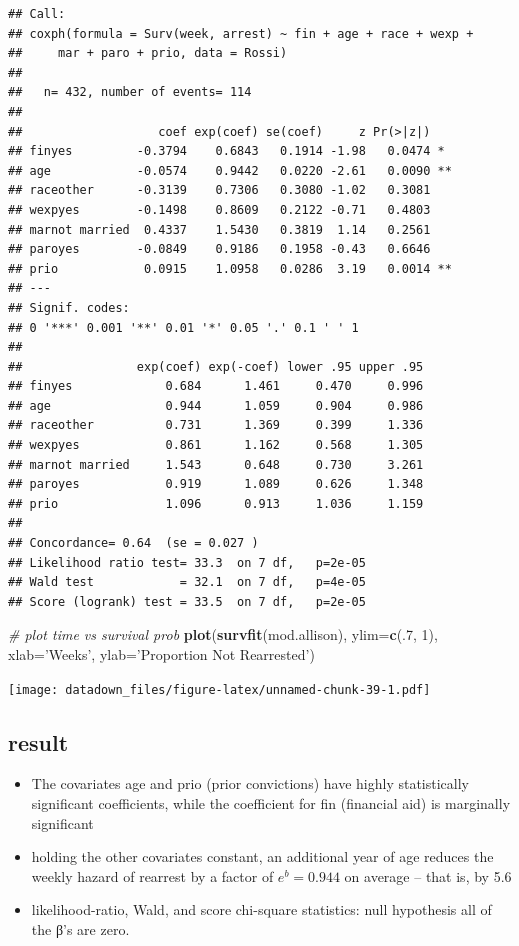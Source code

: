 \documentclass[
]{book}
\newenvironment{Shaded}{\begin{snugshade}}{\end{snugshade}}
\newcommand{\CommentTok}[1]{\textcolor[rgb]{0.56,0.35,0.01}{\textit{#1}}}
\newcommand{\DataTypeTok}[1]{\textcolor[rgb]{0.13,0.29,0.53}{#1}}
\newcommand{\DecValTok}[1]{\textcolor[rgb]{0.00,0.00,0.81}{#1}}
\newcommand{\KeywordTok}[1]{\textcolor[rgb]{0.13,0.29,0.53}{\textbf{#1}}}
\newcommand{\NormalTok}[1]{#1}
\newcommand{\StringTok}[1]{\textcolor[rgb]{0.31,0.60,0.02}{#1}}
\providecommand{\tightlist}{%
  \setlength{\itemsep}{0pt}\setlength{\parskip}{0pt}}
\begin{document}
\begin{verbatim}
## Call:
## coxph(formula = Surv(week, arrest) ~ fin + age + race + wexp + 
##     mar + paro + prio, data = Rossi)
## 
##   n= 432, number of events= 114 
## 
##                   coef exp(coef) se(coef)     z Pr(>|z|)   
## finyes         -0.3794    0.6843   0.1914 -1.98   0.0474 * 
## age            -0.0574    0.9442   0.0220 -2.61   0.0090 **
## raceother      -0.3139    0.7306   0.3080 -1.02   0.3081   
## wexpyes        -0.1498    0.8609   0.2122 -0.71   0.4803   
## marnot married  0.4337    1.5430   0.3819  1.14   0.2561   
## paroyes        -0.0849    0.9186   0.1958 -0.43   0.6646   
## prio            0.0915    1.0958   0.0286  3.19   0.0014 **
## ---
## Signif. codes:  
## 0 '***' 0.001 '**' 0.01 '*' 0.05 '.' 0.1 ' ' 1
## 
##                exp(coef) exp(-coef) lower .95 upper .95
## finyes             0.684      1.461     0.470     0.996
## age                0.944      1.059     0.904     0.986
## raceother          0.731      1.369     0.399     1.336
## wexpyes            0.861      1.162     0.568     1.305
## marnot married     1.543      0.648     0.730     3.261
## paroyes            0.919      1.089     0.626     1.348
## prio               1.096      0.913     1.036     1.159
## 
## Concordance= 0.64  (se = 0.027 )
## Likelihood ratio test= 33.3  on 7 df,   p=2e-05
## Wald test            = 32.1  on 7 df,   p=4e-05
## Score (logrank) test = 33.5  on 7 df,   p=2e-05
\end{verbatim}

\begin{Shaded}
\begin{Highlighting}[]
\CommentTok{# plot time vs survival prob}
\KeywordTok{plot}\NormalTok{(}\KeywordTok{survfit}\NormalTok{(mod.allison), }\DataTypeTok{ylim=}\KeywordTok{c}\NormalTok{(.}\DecValTok{7}\NormalTok{, }\DecValTok{1}\NormalTok{), }\DataTypeTok{xlab=}\StringTok{'Weeks'}\NormalTok{, }\DataTypeTok{ylab=}\StringTok{'Proportion Not Rearrested'}\NormalTok{)}
\end{Highlighting}
\end{Shaded}

\texttt{[image: datadown\_files/figure-latex/unnamed-chunk-39-1.pdf]}

\hypertarget{result}{%
\subsection{result}\label{result}}

\begin{itemize}
\tightlist
\item
  The covariates age and prio (prior convictions) have highly statistically significant coefficients, while the coefficient for fin (financial aid) is marginally significant
\item
  holding the other covariates constant, an additional year of age reduces the weekly hazard of rearrest by a factor of \(e^b = 0.944\) on average -- that is, by 5.6
\item
  likelihood-ratio, Wald, and score chi-square statistics: null hypothesis all of the β's are zero.
\end{itemize}
\end{document}
